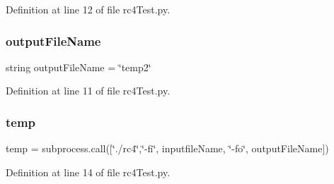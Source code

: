 Definition at line 12 of file rc4\+Test.\+py.

\mbox{\label{namespacerc4_test_aaae3bfdd654e72f5b6cca95ce6467170}} 
\subsubsection{\texorpdfstring{output\+File\+Name}{outputFileName}}
{\footnotesize\ttfamily string output\+File\+Name = \char`\"{}temp2\char`\"{}}



Definition at line 11 of file rc4\+Test.\+py.

\mbox{\label{namespacerc4_test_a905c521e05ec8042631a912b71d0454e}} 
\subsubsection{\texorpdfstring{temp}{temp}}
{\footnotesize\ttfamily temp = subprocess.\+call(\mbox{[}\char`\"{}./rc4\char`\"{},\char`\"{}-\/fi\char`\"{}, inputfile\+Name, \char`\"{}-\/fo\char`\"{}, output\+File\+Name\mbox{]})}



Definition at line 14 of file rc4\+Test.\+py.

